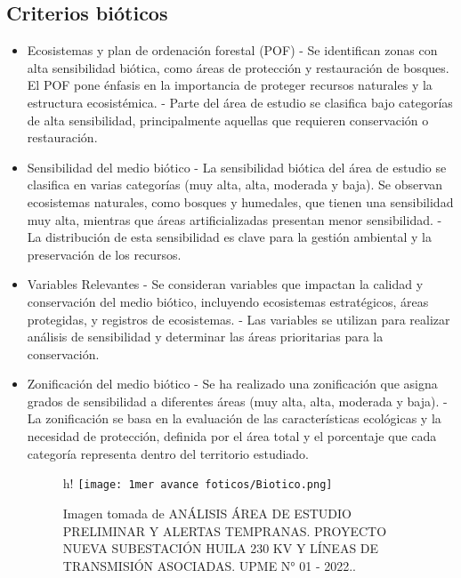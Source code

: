 \subsection{Criterios bióticos}
\begin{itemize}
    \item Ecosistemas y plan de ordenación forestal (POF)
    \subitem - Se identifican zonas con alta sensibilidad biótica, como áreas de protección y restauración de bosques. El POF pone énfasis en la importancia de proteger recursos naturales y la estructura ecosistémica. 
    \subitem - Parte del área de estudio se clasifica bajo categorías de alta sensibilidad, principalmente aquellas que requieren conservación o restauración.
    \\
    \item Sensibilidad del medio biótico
    \subitem - La sensibilidad biótica del área de estudio se clasifica en varias categorías (muy alta, alta, moderada y baja). Se observan ecosistemas naturales, como bosques y humedales, que tienen una sensibilidad muy alta, mientras que áreas artificializadas presentan menor sensibilidad.
    \subitem - La distribución de esta sensibilidad es clave para la gestión ambiental y la preservación de los recursos.
    \\
    \item Variables Relevantes
    \subitem - Se consideran variables que impactan la calidad y conservación del medio biótico, incluyendo ecosistemas estratégicos, áreas protegidas, y registros de ecosistemas. 
    \subitem - Las variables se utilizan para realizar análisis de sensibilidad y determinar las áreas prioritarias para la conservación.
    \\
    \item Zonificación del medio biótico
    \subitem - Se ha realizado una zonificación que asigna grados de sensibilidad a diferentes áreas (muy alta, alta, moderada y baja). 
    \subitem - La zonificación se basa en la evaluación de las características ecológicas y la necesidad de protección, definida por el área total y el porcentaje que cada categoría representa dentro del territorio estudiado.



        \begin{figure}{h!}
            \centering
            \texttt{[image: 1mer avance foticos/Biotico.png]}
            \caption{Imagen tomada de ANÁLISIS ÁREA DE ESTUDIO PRELIMINAR Y ALERTAS TEMPRANAS. PROYECTO NUEVA SUBESTACIÓN HUILA 230 KV Y LÍNEAS DE TRANSMISIÓN ASOCIADAS. UPME N° 01 - 2022..} %
            \label{fig:Torre-Dibujo} %
        \end{figure}



\end{itemize}




